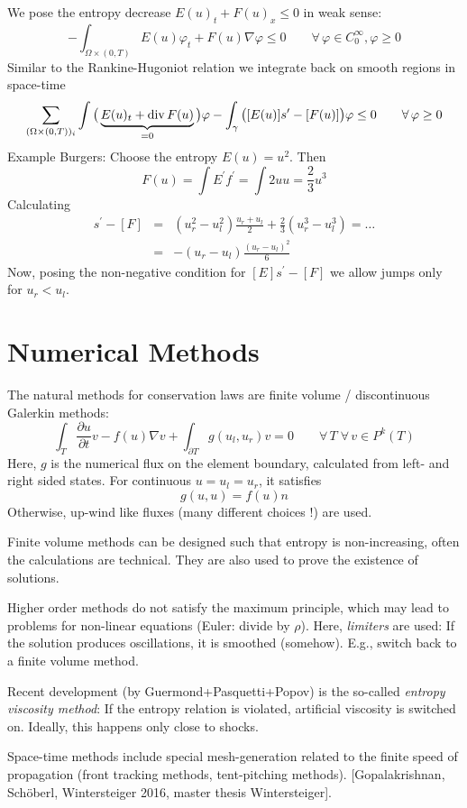We pose the entropy decrease $E(u)_t + F(u)_x \leq 0$ in weak sense:
$$
- \int_{\Omega \times (0,T)}  E(u) \varphi_t + F(u) \nabla \varphi \leq 0
\qquad \forall \, \varphi \in C_0^\infty, \varphi \geq 0
$$
Similar to the Rankine-Hugoniot relation we integrate back on smooth
regions in space-time
$$
\sum_{( \Omega\times (0,T))_i}  \int \big( \underbrace{E(u)_t + \operatorname{div}
  F(u)}_{= 0} \big) \varphi - 
\int_\gamma \big(  [E(u)] s^\prime - [F(u)]  \big) \varphi \leq 0
\qquad \forall \, \varphi \geq 0
$$
Example Burgers:
Choose the entropy $E(u) = u^2$. Then 
$$
F(u) = \int E^\prime f^\prime = \int 2 u u = \frac{2}{3} u^3
$$
Calculating 
\begin{eqnarray*}
[E] s^\prime - [F] & = & (u_r^2 - u_l^2) \frac{u_r + u_l}{2} +
                         \frac{2}{3} (u_r^3 - u _l^3) = \ldots \\ 
& = & -(u_r - u_l) \frac{(u_r-u_l)^2}{6}
\end{eqnarray*}
Now, posing the non-negative condition for $[E] s^\prime - [F]$ we
allow jumps only for $u_r < u_l$. 

\section{Numerical Methods}

The natural methods for conservation laws are finite volume /
discontinuous Galerkin methods:
$$
\int_T \frac{\partial u}{\partial t}  v - f(u) \nabla v +
\int_{\partial T} g (u_l, u_r) v = 0 \qquad \forall \, T \; \forall \,
v \in P^k(T)
$$
Here, $g$ is the numerical flux on the element boundary, calculated
from left- and right sided states. For continuous $u = u_l = u_r$, it satisfies
$$
g(u, u) = f(u) n 
$$
Otherwise, up-wind like fluxes (many different choices !) are
used.

Finite volume methods can be designed such that entropy is
non-increasing, often the calculations are technical. They are also
used to prove the existence of solutions. 

Higher order methods do not satisfy the maximum principle, which may
lead to problems for non-linear equations (Euler: divide by
$\rho$). Here, {\em limiters} are used: If the solution produces
oscillations, it is smoothed (somehow). E.g., switch back to a finite
volume method.

\medskip

Recent development (by Guermond+Pasquetti+Popov) is the so-called
{\em entropy viscosity method}: If the entropy relation is violated,
artificial viscosity is switched on. Ideally, this happens only close
to shocks.

\medskip

Space-time methods include special mesh-generation related to the
finite speed of propagation (front tracking methods,  tent-pitching
methods). [Gopalakrishnan, Sch\"oberl, Wintersteiger 2016, master thesis Wintersteiger].

% 